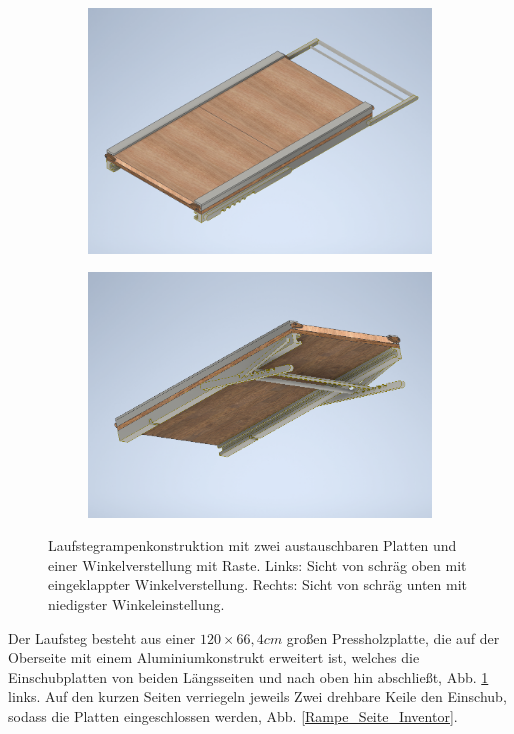 \begin{figure}[tb]
	\hfill
	\begin{subfigure}[c]{.49\linewidth}
		\centering
		\includegraphics[width=\linewidth]{Bilder/Rampe_oben.png}
	\end{subfigure}
	\begin{subfigure}[c]{.49\linewidth}
		\centering
		\includegraphics[width=\linewidth]{Bilder/Rampe_unten.png}
	\end{subfigure}
	\hfill
	\caption{Laufstegrampenkonstruktion mit zwei austauschbaren Platten und einer Winkelverstellung mit Raste. Links: Sicht von schräg oben mit eingeklappter Winkelverstellung. Rechts: Sicht von schräg unten mit niedigster Winkeleinstellung.}
	\label{Rampe_Inventor}
\end{figure}
Der Laufsteg besteht aus einer $120\times66,4 \unit{cm}$ großen Pressholzplatte, die auf der Oberseite mit einem Aluminiumkonstrukt erweitert ist, welches die Einschubplatten von beiden Längsseiten und nach oben hin abschließt, Abb. \ref{Rampe_Inventor} links. Auf den kurzen Seiten verriegeln jeweils Zwei drehbare Keile den Einschub, sodass die Platten eingeschlossen werden, Abb. \ref{Rampe_Seite_Inventor}.

